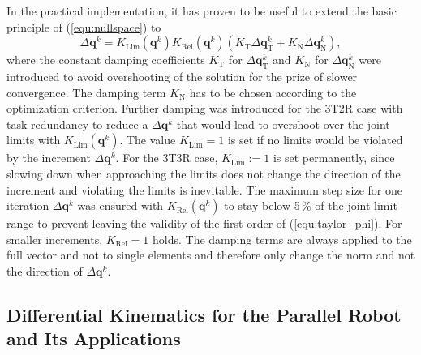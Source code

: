 \documentclass[robotics,article,accept,moreauthors,pdftex]{Definitions/mdpi}
\newcommand{\bm}[1]{\boldsymbol{#1}}
\begin{document}
In the practical implementation, it has proven to be useful to extend the basic principle of (\ref{equ:nullspace}) to
%
\begin{equation}
{\Delta}\bm{q}^k
=
K_\mathrm{Lim}(\bm{q}^k) K_\mathrm{Rel}(\bm{q}^k) (K_\mathrm{T} {\Delta}\bm{q}_{\mathrm{T}}^k + K_\mathrm{N} {\Delta}\bm{q}_{\mathrm{N}}^k),
\label{equ:IK_damping}
\end{equation}
%
where the constant damping coefficients $K_\mathrm{T}$ for ${\Delta}\bm{q}_{\mathrm{T}}^k$ and $K_\mathrm{N}$ for ${\Delta}\bm{q}_{\mathrm{N}}^k$ were introduced to avoid overshooting of the solution for the prize of slower convergence.
The damping term $K_\mathrm{N}$ has to be chosen according to the optimization criterion.
Further damping was introduced for the 3T2R case with task redundancy to reduce a ${\Delta}\bm{q}^{k}$ that would lead to overshoot over the joint limits with $K_\mathrm{Lim}(\bm{q}^k)$. %
The value $K_\mathrm{Lim}=1$ is set if no limits would be violated by the increment ${\Delta}\bm{q}^k$.
For the 3T3R case, $K_\mathrm{Lim}:=1$ is set permanently, since slowing down when approaching the limits does not change the direction of the increment and violating the limits is inevitable.
The maximum step size for one iteration $\Delta\bm{q}^k$ was ensured with $K_\mathrm{Rel}(\bm{q}^k)$ to stay below 5\,\% of the joint limit range to prevent leaving the validity of the first-order  of (\ref{equ:taylor_phi}).
For smaller increments, $K_\mathrm{Rel}=1$ holds.
The damping terms are always applied to the full vector and not to single elements and therefore only change the norm and not the direction of ${\Delta}\bm{q}^k$.



\subsection{Differential Kinematics for the Parallel Robot and Its Applications}
\label{sec:ZB_Anwendung_PKM_DiffKin}
\end{document}
